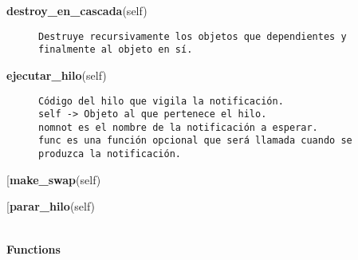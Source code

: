 \begin{description}\item[{\bf destroy\_en\_cascada}(self)]{\tt Destruye~recursivamente~los~objetos~que~dependientes~y~\\
finalmente~al~objeto~en~sí.}\end{description}

\begin{description}\item[{\bf ejecutar\_hilo}(self)\end{description}

\begin{description}\item[{\bf esperarNotificacion}(self, nomnot, func=<function <lambda>>)]{\tt Código~del~hilo~que~vigila~la~notificación.\\
self~->~Objeto~al~que~pertenece~el~hilo.\\
nomnot~es~el~nombre~de~la~notificación~a~esperar.\\
func~es~una~función~opcional~que~será~llamada~cuando~se\\
produzca~la~notificación.}\end{description}

\begin{description}\item[{\bf make\_swap}(self)\end{description}

\begin{description}\item[{\bf parar\_hilo}(self)\end{description}

\par 


~\\
{\bf Functions}
    
